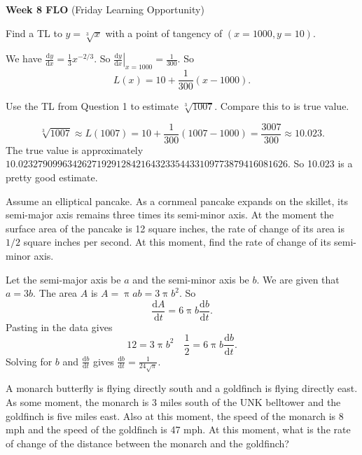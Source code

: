 \documentclass[12pt,fleqn,answers]{exam}
\begin{document}
\vspace{0.1in}

\noindent \textbf{Week 8 FLO} (Friday Learning Opportunity) 

\begin{questions}  
    
  \question Find a TL to $y = \sqrt[3]{x}$ with a point of tangency of
  $(x=1000, y = 10)$. 
  
  \begin{solution}%
  We have $\displaystyle \frac{\mathrm{d} y}{\mathrm{d} x} = \frac{1}{3} x^{-2/3}$. So
  $ \left. \displaystyle \frac{\mathrm{d} y}{\mathrm{d} x}  \right \vert_{x=1000} = \frac{1}{300}$. So 
\[
   L(x) = 10 + \frac{1}{300} (x-1000).
\]

    
  \end{solution}

  \question Use the TL from Question 1 to estimate $\sqrt[3]{1007}$. Compare this to is 
  true value.

  \begin{solution}%
\[
    \sqrt[3]{1007} \approx L(1007) = 10 + \frac{1}{300} (1007-1000) = \frac{3007}{300} \approx 10.023.
\]
The true value is approximately $10.0232790996342627192912842164323354433109773879416081626$. So 10.023
is a pretty good estimate.
    
  \end{solution}

 

  \question Assume an elliptical pancake.  As a cornmeal pancake expands on the skillet,
  its semi-major axis remains three times its semi-minor axis.  At the moment the surface 
  area of the pancake is 12 square inches, the rate of change of its area is $1/2$ 
  square inches per second.  At this moment, find the rate of change of its semi-minor
  axis.

  \begin{solution}[3.5in] Let the semi-major axis be $a$ and the semi-minor axis be $b$. We are
  given that $a = 3 b$.  The area $A$ is $A = \uppi a b = 3 \uppi b^2$. So
  \begin{equation}
    \frac{\mathrm{d} A}{\mathrm{d} t} = 6 \uppi b  \frac{\mathrm{d} b}{\mathrm{d} t}.
  \end{equation}
  Pasting in the data gives
   \begin{equation}
   12 = 3 \uppi b^2   \quad  \frac{1}{2}  = 6 \uppi b  \frac{\mathrm{d} b}{\mathrm{d} t}.
  \end{equation}
  Solving for $b$ and $\frac{\mathrm{d} b}{\mathrm{d} t}$ gives $ \frac{\mathrm{d} b}{\mathrm{d} t} =
  \frac{1}{24 \sqrt{\ensuremath{\pi} }}$.


    
  \end{solution}


  \question A monarch butterfly is flying directly south and a goldfinch is flying directly 
  east.  As some moment, the monarch is 3 miles south of the UNK belltower and the goldfinch
  is five miles east. Also at this moment, the speed of the monarch is 8 mph and the 
  speed of the goldfinch is 47 mph.  At this moment, what is the rate of change of
  the distance between the monarch and the goldfinch?
\end{questions}
\end{document}
